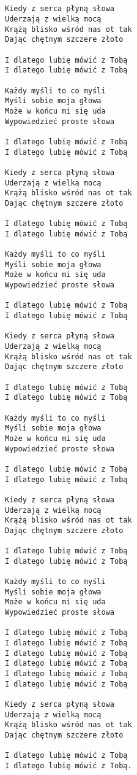 \documentclass[12pt]{article}
\begin{document}
\subsection*{}
\begin{verbatim}
Kiedy z serca płyną słowa
Uderzają z wielką mocą
Krążą blisko wśród nas ot tak
Dając chętnym szczere złoto

I dlatego lubię mówić z Tobą
I dlatego lubię mówić z Tobą

Każdy myśli to co myśli
Myśli sobie moja głowa
Może w końcu mi się uda
Wypowiedzieć proste słowa

I dlatego lubię mówić z Tobą
I dlatego lubię mówić z Tobą

Kiedy z serca płyną słowa
Uderzają z wielką mocą
Krążą blisko wśród nas ot tak
Dając chętnym szczere złoto

I dlatego lubię mówić z Tobą
I dlatego lubię mówić z Tobą

Każdy myśli to co myśli
Myśli sobie moja głowa
Może w końcu mi się uda
Wypowiedzieć proste słowa

I dlatego lubię mówić z Tobą
I dlatego lubię mówić z Tobą

Kiedy z serca płyną słowa
Uderzają z wielką mocą
Krążą blisko wśród nas ot tak
Dając chętnym szczere złoto

I dlatego lubię mówić z Tobą
I dlatego lubię mówić z Tobą

Każdy myśli to co myśli
Myśli sobie moja głowa
Może w końcu mi się uda
Wypowiedzieć proste słowa

I dlatego lubię mówić z Tobą
I dlatego lubię mówić z Tobą

Kiedy z serca płyną słowa
Uderzają z wielką mocą
Krążą blisko wśród nas ot tak
Dając chętnym szczere złoto

I dlatego lubię mówić z Tobą
I dlatego lubię mówić z Tobą

Każdy myśli to co myśli
Myśli sobie moja głowa
Może w końcu mi się uda
Wypowiedzieć proste słowa

I dlatego lubię mówić z Tobą
I dlatego lubię mówić z Tobą
I dlatego lubię mówić z Tobą
I dlatego lubię mówić z Tobą
I dlatego lubię mówić z Tobą
I dlatego lubię mówić z Tobą

Kiedy z serca płyną słowa
Uderzają z wielką mocą
Krążą blisko wśród nas ot tak
Dając chętnym szczere złoto

I dlatego lubię mówić z Tobą
I dlatego lubię mówić z Tobą.
\end{verbatim}
\clearpage
\end{document}
